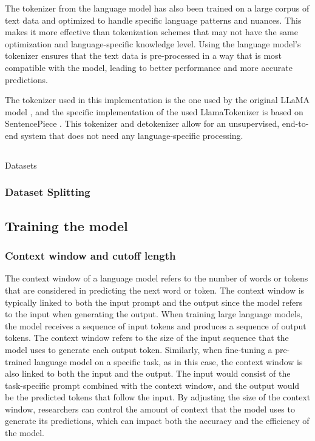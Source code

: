        The tokenizer from the language model has also been trained on a large corpus of text data and optimized to handle specific language patterns and nuances. This makes it more effective than tokenization schemes that may not have the same optimization and language-specific knowledge level. Using the language model's tokenizer ensures that the text data is pre-processed in a way that is most compatible with the model, leading to better performance and more accurate predictions.

        The tokenizer used in this implementation is the one used by the original LLaMA model \cite{touvronLLaMAOpenEfficient2023}, and the specific implementation of the used LlamaTokenizer is based on SentencePiece \cite{LLaMATokenizer, Sentencepiece}. This tokenizer and detokenizer allow for an unsupervised, end-to-end system that does not need any language-specific processing. 

    \subsection{}{Datasets}


    

     

        \subsubsection{Dataset Splitting}
        
        
    \subsection{Training the model}
        \subsubsection{Context window and cutoff length}
        \label{sec:3_cutoff}
        The context window of a language model refers to the number of words or tokens that are considered in predicting the next word or token. The context window is typically linked to both the input prompt and the output since the model refers to the input when generating the output. When training large language models, the model receives a sequence of input tokens and produces a sequence of output tokens. The context window refers to the size of the input sequence that the model uses to generate each output token. Similarly, when fine-tuning a pre-trained language model on a specific task, as in this case, the context window is also linked to both the input and the output. The input would consist of the task-specific prompt combined with the context window, and the output would be the predicted tokens that follow the input. By adjusting the size of the context window, researchers can control the amount of context that the model uses to generate its predictions, which can impact both the accuracy and the efficiency of the model.

